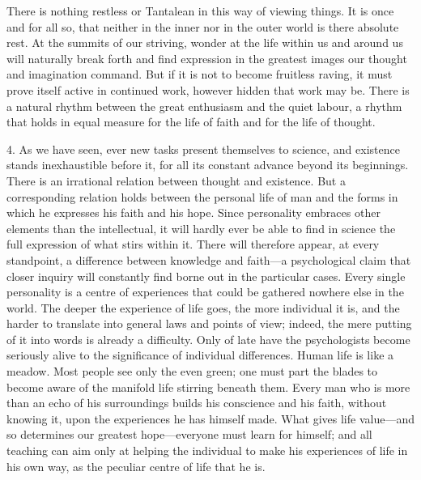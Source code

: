 \documentclass[12pt,a4paper]{article}
\newcommand{\opage}[1]{\marginnote{\footnotesize\textit{[#1]}}}
\begin{document}
There is nothing restless or Tantalean in this way of viewing things. It is once and
for all so, that neither in the inner nor in the outer world is there absolute rest.
At the summits of our striving, wonder at the life within us and around us will
naturally break forth and find expression in the greatest images our thought and
imagination command. But if it is not to become fruitless raving, it must prove
itself active in continued work, however hidden that work may be. There is a natural
rhythm between the great enthusiasm and the quiet labour, a rhythm that holds in equal
measure for the life of faith and for the life of thought.
\medskip

4. As we have seen, ever new tasks present themselves to science, and existence
stands inexhaustible before it, for all its constant advance beyond its beginnings.
There is an irrational relation between thought and existence. But a corresponding
relation holds between the personal life of man and the forms in which he expresses
his faith and his hope. Since personality embraces other elements than the
intellectual, it will hardly ever be able to find in science the full expression of
what stirs within it. There will therefore appear, at every standpoint, a difference
between knowledge and faith---a psychological claim that closer inquiry will constantly
find borne out in the particular cases. Every single personality is a centre of
experiences that could be gathered nowhere else in the world. The deeper the
experience of life goes, the more individual it is, and the harder to translate into
general laws and \opage{48}points of view; indeed, the mere putting of it into words is already
a difficulty. Only of late have the psychologists become seriously alive to the
significance of individual differences. Human life is like a meadow. Most people see
only the even green; one must part the blades to become aware of the manifold life
stirring beneath them. Every man who is more than an echo of his surroundings builds
his conscience and his faith, without knowing it, upon the experiences he has himself
made. What gives life value---and so determines our greatest hope---everyone must
learn for himself; and all teaching can aim only at helping the individual to make his
experiences of life in his own way, as the peculiar centre of life that he is.
\end{document}
